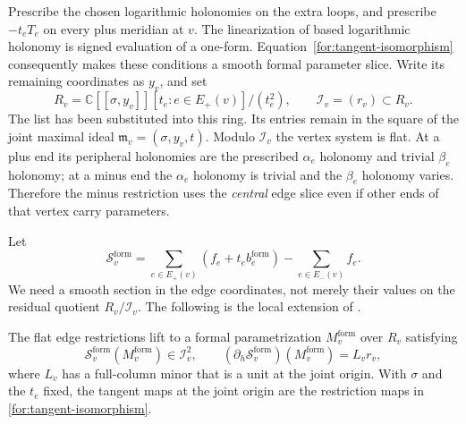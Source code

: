 Prescribe the chosen logarithmic holonomies on the extra loops, and
prescribe $-t_eT_e$ on every plus meridian at $v$.  The linearization
of based logarithmic holonomy is signed evaluation of a one-form.
Equation~\eqref{for:tangent-isomorphism} consequently makes these
conditions a smooth formal parameter slice.  Write its remaining
coordinates as $y_v$, and set
\[
 R_v=\mathbb C[[\sigma,y_v]][t_e:e\in E_+(v)]/(t_e^2),
 \qquad \mathcal I_v=(r_v)\subset R_v.
\]
The list has been substituted into this ring.  Its entries remain in
the square of the joint maximal ideal
$\mathfrak m_v=(\sigma,y_v,t)$.
Modulo $\mathcal I_v$ the vertex system is flat.  At a plus end its
peripheral holonomies are the prescribed $\alpha_e$ holonomy and
trivial $\beta_e$ holonomy; at a minus end the $\alpha_e$ holonomy is
trivial and the $\beta_e$ holonomy varies.  Therefore the minus
restriction uses the \emph{central} edge slice even if other ends of
that vertex carry parameters.

Let
\[
 \mathcal S_v^{\mathrm{form}}
 =\sum_{e\in E_+(v)}(f_e+t_eb_e^{\mathrm{form}})
                         -\sum_{e\in E_-(v)}f_e.
\]
We need a smooth section in the edge coordinates, not merely their
values on the residual quotient $R_v/\mathcal I_v$.  The following
is the local extension of \cite[Lemma~6.3]{MT}.

\begin{lemma}
\label{for:vertex-identities}
The flat edge restrictions lift to a formal parametrization
$M_v^{\mathrm{form}}$ over $R_v$ satisfying
\begin{equation}
\label{for:square-gradient}
 \mathcal S_v^{\mathrm{form}}(M_v^{\mathrm{form}})\in\mathcal I_v^2,
 \qquad
 (\partial_h\mathcal S_v^{\mathrm{form}})(M_v^{\mathrm{form}})
                         =L_vr_v,
\end{equation}
where $L_v$ has a full-column minor that is a unit at the joint origin.
With $\sigma$ and the $t_e$ fixed, the tangent maps at the joint origin
are the restriction maps in \eqref{for:tangent-isomorphism}.
\end{lemma}

